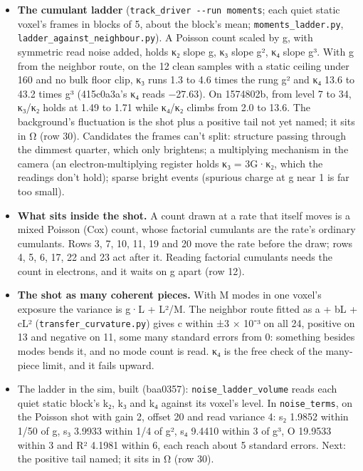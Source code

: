 \begin{enumerate}
\begin{itemize}
\item \textbf{The cumulant ladder} (\texttt{track\_\allowbreak{}driver -\allowbreak{}-\allowbreak{}run moments}; each quiet static voxel's frames in blocks of 5, about the block's mean; \texttt{moments\_\allowbreak{}ladder.\allowbreak{}py}, \texttt{ladder\_\allowbreak{}against\_\allowbreak{}neighbour.\allowbreak{}py}). A Poisson count scaled by g, with symmetric read noise added, holds κ₂ slope g, κ₃ slope g², κ₄ slope g³. With g from the neighbor route, on the 12 clean samples with a static ceiling under 160 and no bulk floor clip, κ₃ runs 1.3 to 4.6 times the rung g² and κ₄ 13.6 to 43.2 times g³ (415c0a3a's κ₄ reads −27.63). On 1574802b, from level 7 to 34, κ₃/κ₂ holds at 1.49 to 1.71 while κ₄/κ₂ climbs from 2.0 to 13.6. The background's fluctuation is the shot plus a positive tail not yet named; it sits in Ω (row 30). Candidates the frames can't split: structure passing through the dimmest quarter, which only brightens; a multiplying mechanism in the camera (an electron-multiplying register holds κ₃ = 3G·κ₂, which the readings don't hold); sparse bright events (spurious charge at g near 1 is far too small).
\item \textbf{What sits inside the shot.} A count drawn at a rate that itself moves is a mixed Poisson (Cox) count, whose factorial cumulants are the rate's ordinary cumulants. Rows 3, 7, 10, 11, 19 and 20 move the rate before the draw; rows 4, 5, 6, 17, 22 and 23 act after it. Reading factorial cumulants needs the count in electrons, and it waits on g apart (row 12).
\item \textbf{The shot as many coherent pieces.} With M modes in one voxel's exposure the variance is g·L + L²/M. The neighbor route fitted as a + bL + cL² (\texttt{transfer\_\allowbreak{}curvature.\allowbreak{}py}) gives c within ±3 × 10⁻³ on all 24, positive on 13 and negative on 11, some many standard errors from 0: something besides modes bends it, and no mode count is read. κ₄ is the free check of the many-piece limit, and it fails upward.
\item The ladder in the sim, built (baa0357): \texttt{noise\_\allowbreak{}ladder\_\allowbreak{}volume} reads each quiet static block's k₂, k₃ and k₄ against its voxel's level. In \texttt{noise\_\allowbreak{}terms}, on the Poisson shot with gain 2, offset 20 and read variance 4: s₂ 1.9852 within 1/50 of g, s₃ 3.9933 within 1/4 of g², s₄ 9.4410 within 3 of g³, O 19.9533 within 3 and R² 4.1981 within 6, each reach about 5 standard errors. Next: the positive tail named; it sits in Ω (row 30).

\end{itemize}
\end{enumerate}
